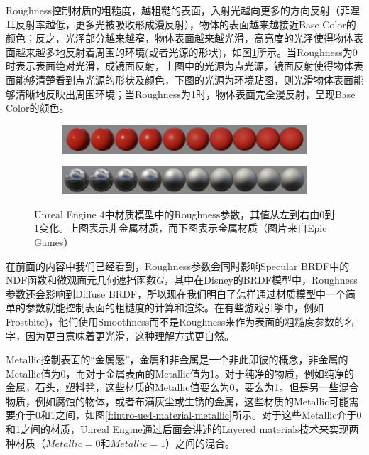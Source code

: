 Roughness控制材质的粗糙度，越粗糙的表面，入射光越向更多的方向反射（菲涅耳反射率越低，更多光被吸收形成漫反射），物体的表面越来越接近Base Color的颜色；反之，光泽部分越来越窄，物体表面越来越光滑，高亮度的光泽使得物体表面越来越多地反射着周围的环境(或者光源的形状)，如图\ref{f:intro-ue4-material-roughness}所示。当Roughness为0时表示表面绝对光滑，成镜面反射，上图中的光源为点光源，镜面反射使得物体表面能够清楚看到点光源的形状及颜色，下图的光源为环境贴图，则光滑物体表面能够清晰地反映出周围环境；当Roughness为1时，物体表面完全漫反射，呈现Base Color的颜色。

\begin{figure}
\begin{fullwidth}
	\begin{subfigure}[b]{1\thewidth}
		\includegraphics[width=1.\textwidth]{graphics/gi/roughness_nonmetal}
	\end{subfigure}
	\begin{subfigure}[b]{1\thewidth}
		\includegraphics[width=1.\textwidth]{graphics/gi/roughness_metal}
	\end{subfigure}
\caption{Unreal Engine 4中材质模型中的Roughness参数，其值从左到右由0到1变化。上图表示非金属材质，而下图表示金属材质（图片来自Epic Games）}
\label{f:intro-ue4-material-roughness}
\end{fullwidth}
\end{figure}

在前面的内容中我们已经看到，Roughness参数会同时影响Specular BRDF中的NDF函数和微观面元几何遮挡函数$G$，其中在Disney的BRDF模型中，Roughness参数还会影响到Diffuse BRDF，所以现在我们明白了怎样通过材质模型中一个简单的参数就能控制表面的粗糙度的计算和渲染。在有些游戏引擎中，例如Frostbite\cite{a:MovingFrostbitetoPBR})，他们使用Smoothness而不是Roughness来作为表面的粗糙度参数的名字，因为更白意味着更光滑，这种理解方式更自然。


Metallic控制表面的“金属感”，金属和非金属是一个非此即彼的概念，非金属的Metallic值为0，而对于金属表面的Metallic值为1。对于纯净的物质，例如纯净的金属，石头，塑料凳，这些材质的Metallic值要么为0，要么为1。但是另一些混合物质，例如腐蚀的物体，或者布满灰尘或生锈的金属，这些材质的Metallic可能需要介于0和1之间，如图\ref{f:intro-ue4-material-metallic}所示。对于这些Metallic介于0和1之间的材质，Unreal Engine通过后面会讲述的Layered materials技术来实现两种材质（$Metallic=0$和$Metallic=1$）之间的混合。

